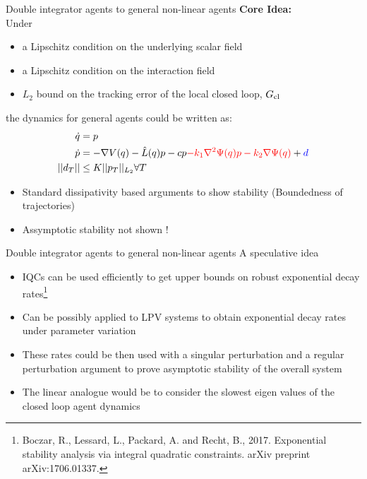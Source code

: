 \begin{frame}{Double integrator agents to general non-linear agents}
\textbf{Core Idea:}
\\
Under  
\begin{itemize}
\item a Lipschitz condition on the underlying scalar field 
\item a Lipschitz condition on the interaction field
\item $L_2$ bound on the tracking error of the local closed loop, $G_{\textnormal{cl}}$
\end{itemize}
the dynamics for general agents could be written as:
\begin{equation*}
\begin{split}
\Dot{q}&=p\\
\Dot{p}&=-\nabla V(q)-\hat{L}(q)p -cp\textcolor{red}{-k_1\nabla^2 \Psi(q) p -k_2 \nabla \Psi(q)} + \textcolor{blue}{d}\\
||d_T||&\leq K ||p_T||_{L_2} \forall T
\end{split}
\end{equation*}	
\begin{itemize}
\item Standard dissipativity based arguments to show stability (Boundedness of trajectories)
\item Assymptotic stability not shown !
\end{itemize}
\end{frame}
\begin{frame}{Double integrator agents to general non-linear agents}
A speculative idea
\begin{itemize}
	\item IQCs can be used efficiently to get upper bounds on robust exponential decay rates\footnote{Boczar, R., Lessard, L., Packard, A. and Recht, B., 2017. Exponential stability analysis via integral quadratic constraints. arXiv preprint arXiv:1706.01337.}
	\item Can be possibly applied to LPV systems to obtain exponential decay rates under parameter variation
	\item These rates could be then used with a singular perturbation and a regular perturbation argument to prove asymptotic stability of the overall system
	\item The linear analogue would be to consider the slowest eigen values of the closed loop agent dynamics
\end{itemize}
\end{frame}
